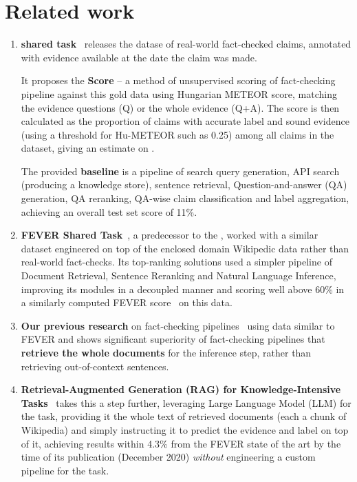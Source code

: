 \section{Related work}
\label{sec:relwork}
\label{avscore}
\begin{enumerate}
    \item \textbf{\averitec{} shared task}~\cite{averitec2024} releases the datase of real-world fact-checked claims, annotated with evidence available at the date the claim was made.
    
    {It proposes the \textbf{\averitec{} Score} -- a method of unsupervised scoring of fact-checking pipeline against this gold data using Hungarian METEOR score, matching the evidence questions (Q) or the whole evidence (Q+A).
    The score is then calculated as the proportion of claims with accurate label and sound evidence (using a threshold for Hu-METEOR such as 0.25) among all claims in the dataset, giving an estimate on .}

    The provided \textbf{baseline} is a pipeline of search query generation, API search (producing a knowledge store), sentence retrieval, Question-and-answer (QA) generation, QA reranking, QA-wise claim classification and label aggregation, achieving an overall \averitec{} test set score of 11\%.  
    \item {\textbf{FEVER Shared Task}~\cite{thorne-etal-2018-fact}, a predecessor to the \averitec{}, worked with a similar dataset engineered on top of the enclosed domain Wikipedic data rather than real-world fact-checks. 
    Its top-ranking solutions used a simpler pipeline of Document Retrieval, Sentence Reranking and Natural Language Inference, improving its modules in a decoupled manner and scoring well above 60\% in a similarly computed FEVER score~\cite{thorne-etal-2018-fever} on this data.}
    \item \textbf{Our previous research} on fact-checking pipelines~\cite{Ullrich2023,drchal2023pipelinedatasetgenerationautomated} using data similar to FEVER and \averitec{} shows significant superiority of fact-checking pipelines that \textbf{retrieve the whole documents} for the inference step, rather than retrieving out-of-context sentences.
    \item \textbf{Retrieval-Augmented Generation (RAG) for Knowledge-Intensive Tasks}~\cite{rag} takes this a step further, leveraging Large Language Model (LLM) for the task, providing it the whole text of retrieved documents (each a chunk of Wikipedia) and simply instructing it to predict the evidence and label on top of it, achieving results within 4.3\% from the FEVER state of the art by the time of its publication (December 2020) \textit{without} engineering a custom pipeline for the task.
\end{enumerate}


